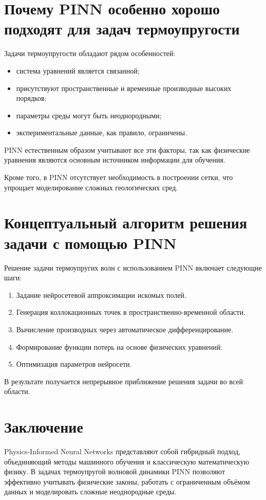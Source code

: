 \documentclass[12pt]{article}
\begin{document}
\section{Почему PINN особенно хорошо подходят для задач термоупругости}

Задачи термоупругости обладают рядом особенностей:
\begin{itemize}
    \item система уравнений является связанной;
    \item присутствуют пространственные и временные производные высоких порядков;
    \item параметры среды могут быть неоднородными;
    \item экспериментальные данные, как правило, ограничены.
\end{itemize}

PINN естественным образом учитывают все эти факторы, так как физические уравнения являются основным источником информации для обучения.

Кроме того, в PINN отсутствует необходимость в построении сетки, что упрощает моделирование сложных геологических сред.

\section{Концептуальный алгоритм решения задачи с помощью PINN}

Решение задачи термоупругих волн с использованием PINN включает следующие шаги:
\begin{enumerate}
    \item Задание нейросетевой аппроксимации искомых полей.
    \item Генерация коллокационных точек в пространственно-временной области.
    \item Вычисление производных через автоматическое дифференцирование.
    \item Формирование функции потерь на основе физических уравнений.
    \item Оптимизация параметров нейросети.
\end{enumerate}

В результате получается непрерывное приближение решения задачи во всей области.

\section{Заключение}

Physics-Informed Neural Networks представляют собой гибридный подход, объединяющий методы машинного обучения и классическую математическую физику. В задачах термоупругой волновой динамики PINN позволяют эффективно учитывать физические законы, работать с ограниченным объёмом данных и моделировать сложные неоднородные среды.
\end{document}

